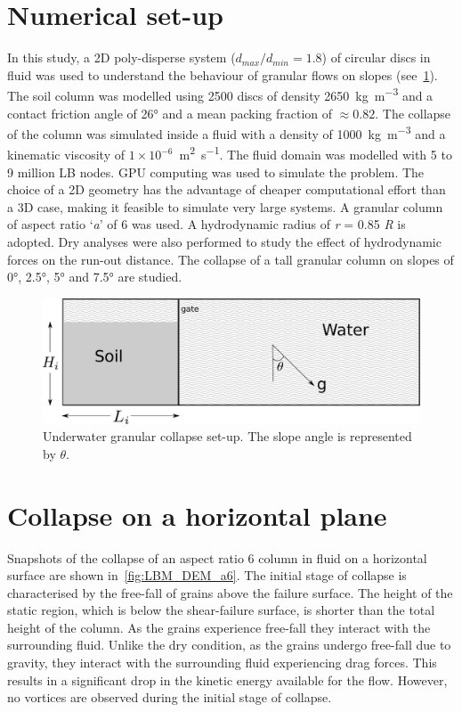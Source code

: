 \documentclass[epj,twocolumn]{webofc}
\begin{document}
\section{Numerical set-up}
In this study, a 2D poly-disperse system ($d_{max} / d_{min} = 1.8$) of
circular discs in fluid was used to understand the behaviour of granular
flows on slopes (see~\cref{fig:geometry}).
The soil column was modelled using 2500 discs of density
2650~\si{\kilogram\per\meter\cubed} and a contact friction angle of
26\si{\degree} and a mean packing fraction of $\approx 0.82$.
The  collapse of the column was simulated inside a fluid
with a density of 1000~\si{\kilogram\per\meter\cubed} and a kinematic viscosity
of $1 \times 10^{-6}$~\si{\meter\squared\per\second}. The fluid domain was modelled
with 5 to 9 million LB nodes. GPU computing was used to simulate the problem.
The choice of a 2D geometry has the advantage of cheaper computational
effort than a 3D case, making it feasible to simulate very large systems.
A granular column of aspect ratio `\textit{a}' of 6 was used. A hydrodynamic
radius of \textit{r} = 0.85 \textit{R} is adopted. Dry analyses were also
performed to study the effect of hydrodynamic forces on the run-out distance.
The collapse of a tall granular column on slopes of 0\si{\degree},
2.5\si{\degree}, 5\si{\degree} and 7.5\si{\degree} are studied.

\begin{figure}
  \centering
  \includegraphics[width=0.95\linewidth]{figs/geometry}
  \caption{Underwater granular collapse set-up.
    The slope angle is represented by $\theta$.}
  \label{fig:geometry}
\end{figure}

\section{Collapse on a horizontal plane}
Snapshots of the collapse of an aspect ratio 6 column in fluid on a horizontal 
surface are shown in~\cref{fig:LBM_DEM_a6}. The initial stage of collapse is 
characterised by the free-fall of grains above the failure surface.
The height of the static region, which is below the shear-failure surface,
is shorter than the total height of the column. As the grains experience
free-fall they interact with the surrounding fluid. Unlike the dry condition,
as the grains undergo free-fall due to gravity, they interact 
with the surrounding fluid experiencing drag forces. This results in a 
significant drop in the kinetic energy available for the flow.
However, no vortices are observed during the initial stage of collapse.
\end{document}
